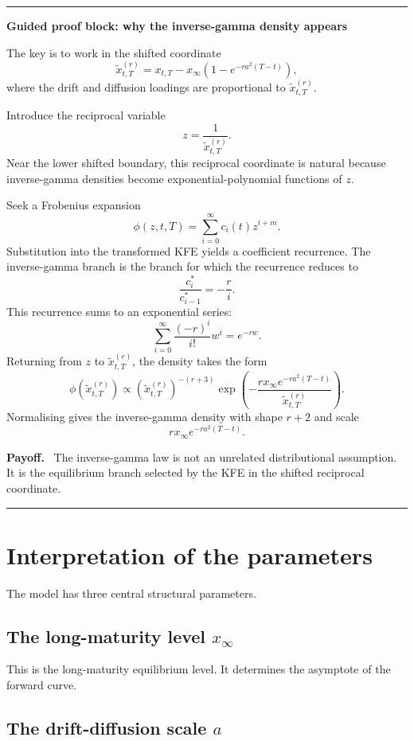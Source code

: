 \documentclass[11pt]{article}
\theoremstyle{plainbreak}
\newenvironment{proofblock}[1]{%
    \vspace{0.5em}\hrule\vspace{0.7em}%
    {\bfseries Guided proof block: #1}\par\vspace{0.2em}%
}{%
    \vspace{0.5em}\hrule\vspace{0.7em}%
}
\newenvironment{takeaway}{%
    \vspace{0.4em}\noindent\textbf{Payoff.}\ }{\par\vspace{0.4em}}
\begin{document}
\begin{proofblock}{why the inverse-gamma density appears}
The key is to work in the shifted coordinate
\[
\widetilde{x}^{(r)}_{t,T}
=
x_{t,T}-x_\infty\left(1-e^{-ra^2(T-t)}\right),
\]
where the drift and diffusion loadings are proportional to \(\widetilde{x}^{(r)}_{t,T}\).

Introduce the reciprocal variable
\[
z=\frac{1}{\widetilde{x}^{(r)}_{t,T}}.
\]
Near the lower shifted boundary, this reciprocal coordinate is natural because inverse-gamma densities become exponential-polynomial functions of \(z\).

Seek a Frobenius expansion
\[
\phi(z,t,T)=\sum_{i=0}^{\infty}c_i(t)z^{i+m}.
\]
Substitution into the transformed KFE yields a coefficient recurrence. The inverse-gamma branch is the branch for which the recurrence reduces to
\[
\frac{c_i^*}{c_{i-1}^*}=-\frac{r}{i}.
\]
This recurrence sums to an exponential series:
\[
\sum_{i=0}^{\infty}\frac{(-r)^i}{i!}w^i = e^{-rw}.
\]
Returning from \(z\) to \(\widetilde{x}^{(r)}_{t,T}\), the density takes the form
\[
\phi(\widetilde{x}^{(r)}_{t,T})
\propto
\left(\widetilde{x}^{(r)}_{t,T}\right)^{-(r+3)}
\exp\left(
-\frac{rx_\infty e^{-ra^2(T-t)}}{\widetilde{x}^{(r)}_{t,T}}
\right).
\]
Normalising gives the inverse-gamma density with shape \(r+2\) and scale
\[
rx_\infty e^{-ra^2(T-t)}.
\]

\begin{takeaway}
The inverse-gamma law is not an unrelated distributional assumption. It is the equilibrium branch selected by the KFE in the shifted reciprocal coordinate.
\end{takeaway}
\end{proofblock}

\section{Interpretation of the parameters}

The model has three central structural parameters.

\subsection*{The long-maturity level \texorpdfstring{\(x_\infty\)}{x-infinity}}

This is the long-maturity equilibrium level. It determines the asymptote of the forward curve.

\subsection*{The drift-diffusion scale \texorpdfstring{\(a\)}{a}}
\end{document}
